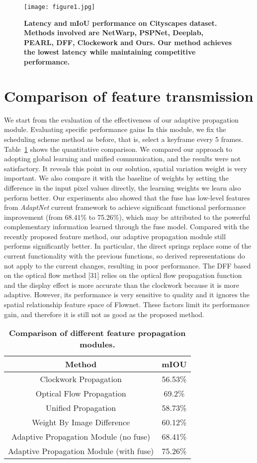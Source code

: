 \documentclass[a4paper,12pt]{article}
\begin{document}
 \begin{figure}[htp]
 	\centering
 	\texttt{[image: figure1.jpg]}
 	\caption{\bfseries{  Latency and mIoU performance on Cityscapes	dataset. Methods involved are NetWarp, PSPNet, Deeplab, PEARL, DFF\cite{Zhu_2017_Deep}, Clockework and Ours. Our method achieves the lowest latency while maintaining competitive performance. }}\label{pic1}
 \end{figure}
\section{Comparison of feature transmission}
We start from the evaluation of the effectiveness of our adaptive propagation module. Evaluating specific performance gains In this module, we fix the scheduling scheme method as before, that is, select a keyframe every 5 frames. Table~\ref{table1} shows the quantitative comparison. We compared our approach to adopting global learning and unified communication, and the results were not satisfactory. It reveals this point in our solution, spatial variation weight is very important. We also compare it with the baseline of weights by setting the difference in the input pixel values ​directly, the learning weights we learn also perform better. Our experiments also showed that the fuse has low-level features from \emph{AdaptNet} current framework to achieve significant functional performance improvement (from 68.41\% to 75.26\%), which may be attributed to the powerful complementary information learned through the fuse model. Compared with the recently proposed feature method, our adaptive propagation module still performs significantly better. In particular, the direct springs replace some of the current functionality with the previous functions, so derived representations do not apply to the current changes, resulting in poor performance. The DFF based on the optical flow method [31] relies on the optical flow propagation function and the display effect is more accurate than the clockwork because it is more adaptive. However, its performance is very sensitive to quality and it ignores the spatial relationship feature space of Flownet. These factors limit its performance gain, and therefore it is still not as good as the proposed method.
	\begin{table}[h]%
	\centering 
	\caption{\bfseries{ Comparison of different feature propagation modules.}}\label{table1}
	\begin{tabular}{c|c}
		\hline
		Method &  mIOU  \\
		\hline
		Clockwork Propagation    &  56.53\% \\
		Optical Flow Propagation\cite{Zhu_2017_Deep}    &  69.2\% \\
		\hline
		Unified Propagation& 58.73\%	 \\
		  Weight By Image Difference& 60.12\%   \\
		Adaptive Propagation Module (no fuse) &68.41\%  \\
		Adaptive Propagation Module (with fuse) &75.26\%
 \\
		\hline
	\end{tabular}
\end{table}
\end{document}
